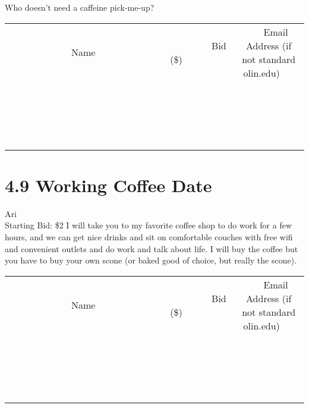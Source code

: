 \documentclass[11pt]{article}
\begin{document}
Who doesn't need a caffeine pick-me-up?
\\[3ex]
\begin{tabular}{c c c}
~~~~~~~~~~~~~Name~~~~~~~~~~~~~ & ~~~~~~~~~Bid (\$)~~~~~~~~~  & ~~~Email Address (if not standard olin.edu)~~~\\
 & & \\
\hline
 & & \\
\hline
 & & \\
\hline
 & & \\
\hline
 & & \\
\hline
 & & \\
\hline
 & & \\
\hline
 & & \\
\hline
 & & \\
\hline
 & & \\
\hline
 & & \\
\hline
 & & \\
\hline
 & & \\
\hline
 & & \\
\hline
 & & \\
\hline
 & & \\
\hline
 & & \\
\hline
 & & \\
\hline
 & & \\
\hline
\end{tabular}
\newpage
\section*{4.9 Working Coffee Date}
Ari
\\
Starting Bid: \$2
\newline
I will take you to my favorite coffee shop to do work for a few hours, and we can get nice drinks and sit on comfortable couches with free wifi and convenient outlets and do work and talk about life. I will buy the coffee but you have to buy your own scone (or baked good of choice, but really the scone).
\\[3ex]
\begin{tabular}{c c c}
~~~~~~~~~~~~~Name~~~~~~~~~~~~~ & ~~~~~~~~~Bid (\$)~~~~~~~~~  & ~~~Email Address (if not standard olin.edu)~~~\\
 & & \\
\hline
 & & \\
\hline
 & & \\
\hline
 & & \\
\hline
 & & \\
\hline
 & & \\
\hline
 & & \\
\hline
 & & \\
\hline
 & & \\
\hline
 & & \\
\hline
 & & \\
\hline
 & & \\
\hline
 & & \\
\hline
 & & \\
\hline
 & & \\
\hline
 & & \\
\hline
 & & \\
\hline
 & & \\
\hline
 & & \\
\hline
\end{tabular}
\newpage
\end{document}
